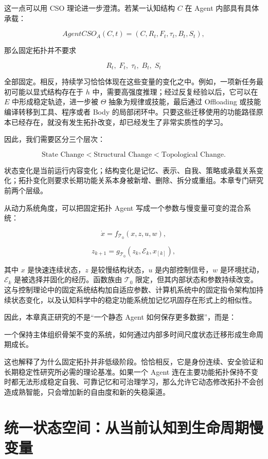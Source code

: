 这一点可以用 CSO 理论进一步澄清。若某一认知结构 $C$ 在 Agent 内部具有具体承载：

\[
AgentCSO_A(C,t)
=
(C,R_t,F_t,\tau_t,B_t,S_t),
\]

那么固定拓扑并不要求

\[
R_t,\;F_t,\;\tau_t,\;B_t,\;S_t
\]

全部固定。相反，持续学习恰恰体现在这些变量的变化之中。例如，一项新任务最初可能以显式结构存在于 $h$ 中，需要高强度推理；经过反复经验以后，它可以在 $E$ 中形成稳定轨迹，进一步被 $\Theta$ 抽象为规律或技能，最后通过 Offloading 或技能编译转移到工具、程序或者 Body 的局部闭环中。只要这些迁移使用的功能路径原本已经存在，就没有发生拓扑改变，却已经发生了非常实质性的学习。

因此，我们需要区分三个层次：

\[
\boxed{
\text{State Change}
<
\text{Structural Change}
<
\text{Topological Change}.
}
\]

状态变化是当前运行内容变化；结构变化是记忆、表示、自我、策略或承载关系变化；拓扑变化则要求长期功能关系本身被新增、删除、拆分或重组。本章专门研究前两个层级。

从动力系统角度，可以把固定拓扑 Agent 写成一个参数与慢变量可变的混合系统：

\[
\dot{x}
=
f_{\mathcal{T}_0}
\left(
x,
z,
u,
w
\right),
\]

\[
z_{k+1}
=
g_{\mathcal{T}_0}
\left(
z_k,
\mathcal{E}_k,
x_{[k]}
\right),
\]

其中 $x$ 是快速连续状态，$z$ 是较慢结构状态，$u$ 是内部控制信号，$w$ 是环境扰动，$\mathcal{E}_k$ 是被选择并固化的经历。函数族由 $\mathcal{T}_0$ 限定，但其内部状态和参数持续改变。这与控制理论中的固定系统结构加自适应参数、计算机系统中的固定指令架构加持续状态变化，以及认知科学中的稳定功能系统加记忆巩固存在形式上的相似性。

因此，本章真正研究的不是“一个静态 Agent 如何保存更多数据”，而是：

\begin{statementbox}
一个保持主体组织骨架不变的系统，如何通过内部多时间尺度状态迁移形成生命周期成长。
\end{statementbox}

这也解释了为什么固定拓扑并非低级阶段。恰恰相反，它是身份连续、安全验证和长期稳定性研究所必需的理论基准。如果一个 Agent 连在主要功能拓扑保持不变时都无法形成稳定自我、可靠记忆和可治理学习，那么允许它动态修改拓扑不会创造成熟智能，只会增加新的自由度和新的失稳渠道。

\section{统一状态空间：从当前认知到生命周期慢变量}

